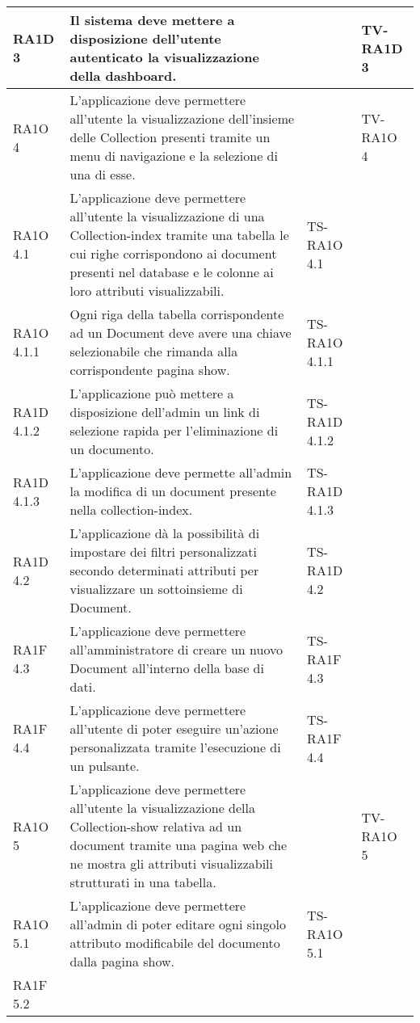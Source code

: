 \begin{center}
\begin{longtable}{| p{2cm} | p{6cm} | p{2.5cm} | p{2.5cm} | }
        RA1D 3 & 
        Il sistema deve mettere a disposizione dell'utente autenticato la visualizzazione della dashboard. &  & TV-RA1D 3 \\ \hline 
        RA1O 4 & 
        L'applicazione deve permettere all'utente la visualizzazione dell'insieme delle Collection presenti tramite un menu di navigazione e la selezione di una di esse. &  & TV-RA1O 4 \\ \hline 
        RA1O 4.1 & 
        L'applicazione deve permettere all'utente la visualizzazione di una Collection-index tramite una tabella le cui righe corrispondono ai document presenti nel database e le colonne ai loro attributi visualizzabili. & TS-RA1O 4.1 & \\ \hline 
        RA1O 4.1.1 & 
        Ogni riga della tabella corrispondente ad un Document deve avere una chiave selezionabile che rimanda alla corrispondente pagina show. & TS-RA1O 4.1.1 & \\ \hline 
        RA1D 4.1.2 & 
        L’applicazione può mettere a disposizione dell’admin un link di selezione rapida per l’eliminazione di un documento. & TS-RA1D 4.1.2 & \\ \hline 
        RA1D 4.1.3 & 
        L’applicazione deve permette all’admin la modifica di un document presente nella collection-index. & TS-RA1D 4.1.3 & \\ \hline 
        RA1D 4.2 & 
        L’applicazione dà la possibilità di impostare dei filtri personalizzati secondo determinati attributi per visualizzare un sottoinsieme di Document. & TS-RA1D 4.2 & \\ \hline 
        RA1F 4.3 & 
        L’applicazione deve permettere all’amministratore di creare un nuovo Document all’interno della base di dati. & TS-RA1F 4.3 & \\ \hline 
        RA1F 4.4 & 
        L’applicazione deve permettere all’utente di poter eseguire un’azione personalizzata tramite l’esecuzione di un pulsante. & TS-RA1F 4.4 & \\ \hline 
        RA1O 5 & 
        L'applicazione deve permettere all'utente la visualizzazione della Collection-show relativa ad un document tramite una pagina web che ne mostra gli attributi visualizzabili strutturati in una tabella. &  & TV-RA1O 5 \\ \hline 
        RA1O 5.1 & 
        L'applicazione deve permettere all'admin di poter editare ogni singolo attributo modificabile del documento dalla pagina show. & TS-RA1O 5.1 & \\ \hline 
        RA1F 5.2 & 

\end{longtable}
\end{center}
